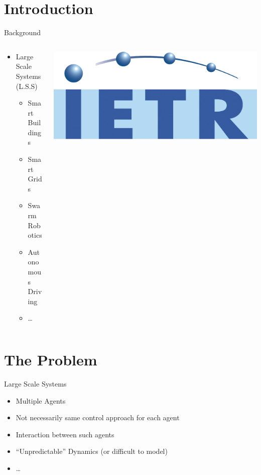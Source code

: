 \documentclass[presentation]{beamer}
\begin{document}
\section{Introduction}
\label{sec:org0a46414}
\begin{frame}[label={sec:org4ebee6e}]{Background}
\begin{columns}
\begin{column}{0.48\columnwidth}
\begin{itemize}
\item Large Scale Systems (L.S.S)  \pause 
\begin{itemize}
\item Smart Buildings
\item Smart Grids
\item Swarm Robotics
\item Autonomous Driving
\item \ldots{}
\end{itemize}
\end{itemize}
\end{column}
\begin{column}{0.48\columnwidth}
\begin{center}
\includegraphics[width=.9\linewidth]{logos/logo_IETR.png}
\end{center}
\end{column}
\end{columns}
\end{frame}


\section{The Problem}
\label{sec:org925c16c}
\begin{frame}[label={sec:orge1ce75b}]{Large Scale Systems}
\begin{itemize}
\item Multiple Agents
\item Not necessarily same control approach for each agent
\item Interaction between such agents
\item ``Unpredictable'' Dynamics (or difficult to model)
\item \ldots{}
\end{itemize}
\end{frame}
\appendix
\end{document}
